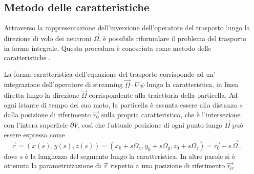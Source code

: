 \subsection{Metodo delle caratteristiche \label{metcaratt}}
Attraverso la rappresentazione dell'inversione dell'operatore del trasporto 
lungo la direzione di volo dei neutroni $\vec{\Omega}$, è possibile riformulare 
il problema del trasporto in forma integrale. Questa procedura è conosciuta come 
metodo delle caratteristiche \cite{askew}.

La forma caratteristica dell'equazione del trasporto corrisponde ad un'
integrazione dell'operatore di streaming $\vec{\Omega}\cdot\nabla\psi$ lungo la 
caratteristica, in linea diretta lungo la direzione $\vec{\Omega}$ 
corrispondente alla traiettoria della particella. 
Ad ogni istante di tempo del suo moto, la particella è assunta essere alla 
distanza $s$ dalla posizione di riferimento $\vec{r_0}$ sulla propria 
caratteristica, che è l'intersezione con l'intera superficie $\partial V$, così 
che l'attuale posizione di ogni punto lungo $\vec{\Omega}$ può essere espressa 
come
\begin{equation}
\vec{r}= (x(s),y(s),z(s))=(x_0+s\Omega_x, y_0+s\Omega_y, 
z_0+s\Omega_z)=\vec{r_0}+s\,\vec{\Omega} \,,
\end{equation}
dove $s$ è la lunghezza del segmento lungo la caratteristica. In altre parole si 
è ottenuta la parametrizzazione di $\vec{r}$ rispetto a una posizione di 
riferimento $\vec{r_0}$.

